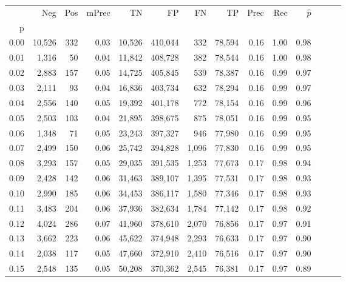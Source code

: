 \begin{tabular}{rrrrrrrrrrrrrr}
\toprule
{} &     Neg &    Pos & mPrec &       TN &       FP &      FN &      TP &  Prec &   Rec & $\hat{p}$ \\
p    &         &        &       &          &          &         &         &       &       &           \\
\midrule
0.00 &  10,526 &    332 &  0.03 &   10,526 &  410,044 &     332 &  78,594 &  0.16 &  1.00 &      0.98 \\
0.01 &   1,316 &     50 &  0.04 &   11,842 &  408,728 &     382 &  78,544 &  0.16 &  1.00 &      0.98 \\
0.02 &   2,883 &    157 &  0.05 &   14,725 &  405,845 &     539 &  78,387 &  0.16 &  0.99 &      0.97 \\
0.03 &   2,111 &     93 &  0.04 &   16,836 &  403,734 &     632 &  78,294 &  0.16 &  0.99 &      0.97 \\
0.04 &   2,556 &    140 &  0.05 &   19,392 &  401,178 &     772 &  78,154 &  0.16 &  0.99 &      0.96 \\
0.05 &   2,503 &    103 &  0.04 &   21,895 &  398,675 &     875 &  78,051 &  0.16 &  0.99 &      0.95 \\
0.06 &   1,348 &     71 &  0.05 &   23,243 &  397,327 &     946 &  77,980 &  0.16 &  0.99 &      0.95 \\
0.07 &   2,499 &    150 &  0.06 &   25,742 &  394,828 &   1,096 &  77,830 &  0.16 &  0.99 &      0.95 \\
0.08 &   3,293 &    157 &  0.05 &   29,035 &  391,535 &   1,253 &  77,673 &  0.17 &  0.98 &      0.94 \\
0.09 &   2,428 &    142 &  0.06 &   31,463 &  389,107 &   1,395 &  77,531 &  0.17 &  0.98 &      0.93 \\
0.10 &   2,990 &    185 &  0.06 &   34,453 &  386,117 &   1,580 &  77,346 &  0.17 &  0.98 &      0.93 \\
0.11 &   3,483 &    204 &  0.06 &   37,936 &  382,634 &   1,784 &  77,142 &  0.17 &  0.98 &      0.92 \\
0.12 &   4,024 &    286 &  0.07 &   41,960 &  378,610 &   2,070 &  76,856 &  0.17 &  0.97 &      0.91 \\
0.13 &   3,662 &    223 &  0.06 &   45,622 &  374,948 &   2,293 &  76,633 &  0.17 &  0.97 &      0.90 \\
0.14 &   2,038 &    117 &  0.05 &   47,660 &  372,910 &   2,410 &  76,516 &  0.17 &  0.97 &      0.90 \\
0.15 &   2,548 &    135 &  0.05 &   50,208 &  370,362 &   2,545 &  76,381 &  0.17 &  0.97 &      0.89 \\

\end{tabular}
